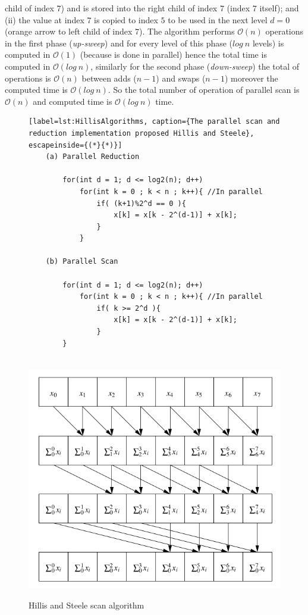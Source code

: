 \documentclass[Ingles]{ic-tese-v1}
\begin{document}
child of index  $7$) and is stored  into the right child  of index $7$
(index $7$ itself); and (ii) the value at index $7$ is copied to index
$5$ to be used  in the next level $d = 0$ (orange  arrow to left child
of index $7$). The algorithm  performs $\mathcal{O}(n)$ operations in the first
phase (\textit{up-sweep}) and for every level of this phase ($log\ n $ levels) is computed in $\mathcal{O}(1)$ (because is done in parallel) hence the total time is computed in $\mathcal{O}(log\ n)$, similarly for the second phase (\textit{down-sweep}) the total of operations is $\mathcal{O}(n)$ between adds ($n-1$) and swaps ($n-1$) moreover the computed time is $\mathcal{O}(log\ n)$. So the total number of operation of parallel scan is $\mathcal{O}(n)$ and computed time is $\mathcal{O}(log\ n)$ time.\\
 

\begin{figure}[t]
	\lstset{basicstyle=\scriptsize}
	\begin{lstlisting}[label=lst:HillisAlgorithms, caption={The parallel scan and reduction implementation proposed Hillis and Steele}, escapeinside={(*}{*)}]
	(a) Parallel Reduction
		
		for(int d = 1; d <= log2(n); d++)
			for(int k = 0 ; k < n ; k++){ //In parallel
				if( (k+1)%2^d == 0 ){
					x[k] = x[k - 2^(d-1)] + x[k];
				}
			}
		
	(b) Parallel Scan
		
		for(int d = 1; d <= log2(n); d++)
			for(int k = 0 ; k < n ; k++){ //In parallel
				if( k >= 2^d ){
					x[k] = x[k - 2^(d-1)] + x[k];
				}
		}
	
	\end{lstlisting}
\end{figure}

\begin{figure}[t]
	\centering
	\caption{Hillis and  Steele scan algorithm}
	\includegraphics[scale=0.5]{images/hillisscan.png}
	\label{fig:scanhillis}
	
\end{figure}
\end{document}
